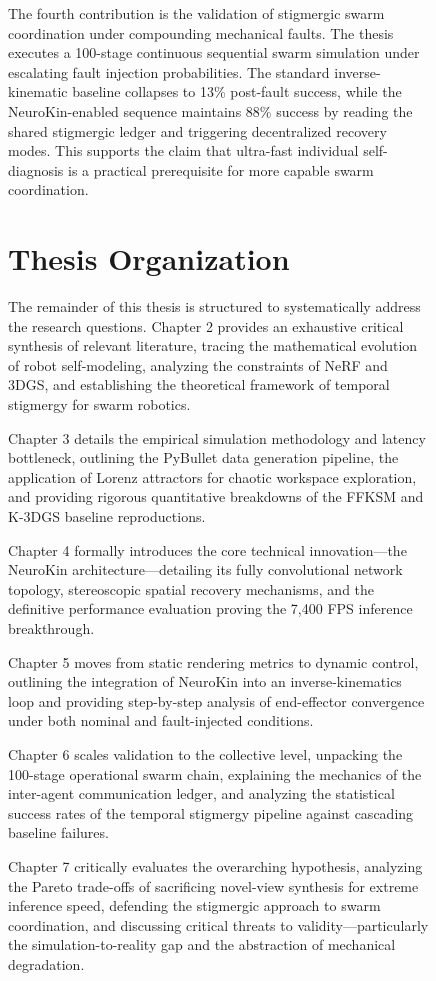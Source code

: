 \documentclass[12pt,a4paper,oneside]{report}
\begin{document}
\begin{figure}[H]
The fourth contribution is the validation of stigmergic swarm coordination under compounding mechanical faults. The thesis executes a 100-stage continuous sequential swarm simulation under escalating fault injection probabilities. The standard inverse-kinematic baseline collapses to 13\% post-fault success, while the NeuroKin-enabled sequence maintains 88\% success by reading the shared stigmergic ledger and triggering decentralized recovery modes. This supports the claim that ultra-fast individual self-diagnosis is a practical prerequisite for more capable swarm coordination.

\section{Thesis Organization}
\label{sec:thesis_organization_intro}

The remainder of this thesis is structured to systematically address the research questions. Chapter 2 provides an exhaustive critical synthesis of relevant literature, tracing the mathematical evolution of robot self-modeling, analyzing the constraints of NeRF and 3DGS, and establishing the theoretical framework of temporal stigmergy for swarm robotics.

Chapter 3 details the empirical simulation methodology and latency bottleneck, outlining the PyBullet data generation pipeline, the application of Lorenz attractors for chaotic workspace exploration, and providing rigorous quantitative breakdowns of the FFKSM and K-3DGS baseline reproductions.

Chapter 4 formally introduces the core technical innovation---the NeuroKin architecture---detailing its fully convolutional network topology, stereoscopic spatial recovery mechanisms, and the definitive performance evaluation proving the 7,400 FPS inference breakthrough.

Chapter 5 moves from static rendering metrics to dynamic control, outlining the integration of NeuroKin into an inverse-kinematics loop and providing step-by-step analysis of end-effector convergence under both nominal and fault-injected conditions.

Chapter 6 scales validation to the collective level, unpacking the 100-stage operational swarm chain, explaining the mechanics of the inter-agent communication ledger, and analyzing the statistical success rates of the temporal stigmergy pipeline against cascading baseline failures.

Chapter 7 critically evaluates the overarching hypothesis, analyzing the Pareto trade-offs of sacrificing novel-view synthesis for extreme inference speed, defending the stigmergic approach to swarm coordination, and discussing critical threats to validity---particularly the simulation-to-reality gap and the abstraction of mechanical degradation.


\end{figure}
\end{document}
